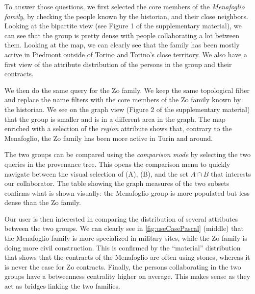 To answer those questions, we first selected the core members of the \textit{Menafoglio family}, by checking the people known by the historian, and their close neighbors.
Looking at the bipartite view (see Figure 1 of the supplementary material), we can see that the group is pretty dense with people collaborating a lot between them.
Looking at the map, we can clearly see that the family has been mostly active in Piedmont outside of Torino and Torino's close territory.
We also have a first view of the attribute distribution of the persons in the group and their contracts.

We then do the same query for the Zo family. We keep the same topological filter and replace the name filters with the core members of the Zo family known by the historian. We see on the graph view (Figure 2 of the supplementary material) that the group is smaller and is in a different area in the graph. The map enriched with a selection of the \textit{region} attribute shows that, contrary to the Menafoglio, the Zo family has been more active in Turin and around.

The two groups can be compared using the \textit{comparison mode} by selecting the two queries in the provenance tree. This opens the comparison menu to quickly navigate between the visual selection of (A), (B), and the set $A \cap B$ that interests our collaborator. The table showing the graph measures of the two subsets confirms what is shown visually: the Menafoglio group is more populated but less dense than the Zo family.

Our user is then interested in comparing the distribution of several attributes between the two groups. We can clearly see in \autoref{fig:useCasePascal} (middle) that the Menafoglio family is more specialized in military sites, while the Zo family is doing more civil construction. This is confirmed by the ``material'' distribution that shows that the contracts of the Menafoglio are often using stones, whereas it is never the case for Zo contracts. Finally, the persons collaborating in the two groups have a betweenness centrality higher on average. This makes sense as they act as bridges linking the two families.


